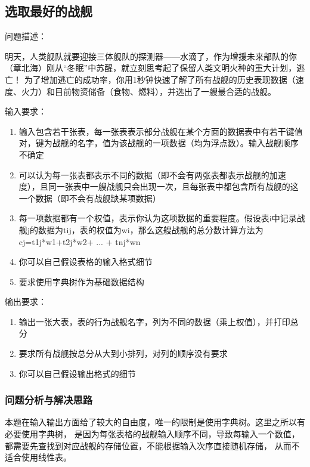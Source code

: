 \subsection{选取最好的战舰}
\begin{formal}
    {\cuhei 问题描述：}

    明天，人类舰队就要迎接三体舰队的探测器——水滴了，作为增援未来部队的你（章北海）刚从“冬眠”中苏醒，就立刻思考起了保留人类文明火种的重大计划，逃亡！
为了增加逃亡的成功率，你用1秒钟快速了解了所有战舰的历史表现数据（速度、火力）和目前物资储备（食物、燃料），并选出了一艘最合适的战舰。
\end{formal}
\begin{formal}
    {\cuhei 输入要求：}

    \begin{enumerate}
        \item 输入包含若干张表，每一张表表示部分战舰在某个方面的数据表中有若干键值对，键为战舰的名字，值为该战舰的一项数据（均为浮点数）。输入战舰顺序不确定
        \item 可以认为每一张表都表示不同的数据（即不会有两张表都表示战舰的加速度），且同一张表中一艘战舰只会出现一次，且每张表中都包含所有战舰的这一个数据（即不会有战舰缺某项数据）
        \item 每一项数据都有一个权值，表示你认为这项数据的重要程度。假设表i中记录战舰j的数据为tij，表的权值为wi，那么这艘战舰的总分数计算方法为cj=t1j*w1+t2j*w2+ ... + tnj*wn
        \item 你可以自己假设表格的输入格式细节
        \item 要求使用字典树作为基础数据结构
    \end{enumerate}
\end{formal}
\begin{formal}
    {\cuhei 输出要求：}

    \begin{enumerate}
        \item 输出一张大表，表的行为战舰名字，列为不同的数据（乘上权值），并打印总分
        \item 要求所有战舰按总分从大到小排列，对列的顺序没有要求
        \item 你可以自己假设输出格式的细节
    \end{enumerate}
\end{formal}
\subsubsection{问题分析与解决思路}
本题在输入输出方面给了较大的自由度，唯一的限制是使用字典树。这里之所以有必要使用字典树，
是因为每张表格的战舰输入顺序不同，导致每输入一个数值，都需要先查找到对应战舰的存储位置，不能根据输入次序直接随机存储，
从而不适合使用线性表。

